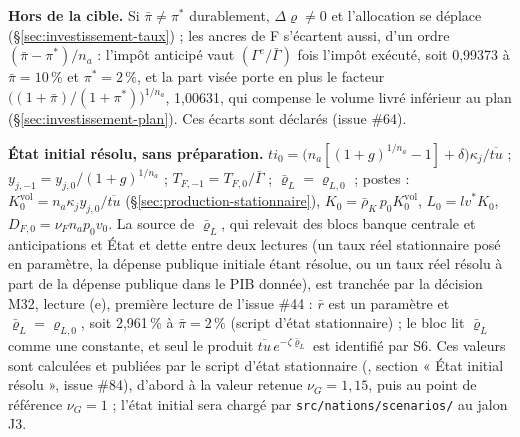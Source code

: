 \documentclass[11pt,a4paper]{article}
\newcommand{\code}[1]{\texttt{\detokenize{#1}}}
\begin{document}
\begin{proposee}
\textbf{Hors de la cible.} Si $\bar\pi \neq \pi^\ast$ durablement, $\Delta\varrho \neq 0$ et l'allocation se déplace (\S\ref{sec:investissement-taux}) ; les ancres de F s'écartent aussi, d'un ordre $(\bar\pi - \pi^\ast)/n_a$ : l'impôt anticipé vaut $(\Gamma^e/\bar\Gamma)$ fois l'impôt exécuté, soit 0,99373 à $\bar\pi = 10\,\%$ et $\pi^\ast = 2\,\%$, et la part visée porte en plus le facteur $\bigl((1 + \bar\pi)/(1 + \pi^\ast)\bigr)^{1/n_a}$, 1,00631, qui compense le volume livré inférieur au plan (\S\ref{sec:investissement-plan}). Ces écarts sont déclarés (issue \#64).

\textbf{État initial résolu, sans préparation.} $\mathit{ti}_0 = \bigl(n_a[(1 + g)^{1/n_a} - 1] + \delta\bigr)\kappa_j/\overline{\mathit{tu}}$ ; $y_{j,-1} = y_{j,0}/(1 + g)^{1/n_a}$ ; $T_{F,-1} = T_{F,0}/\bar\Gamma$ ; $\bar\varrho_L = \varrho_{L,0}$ ; postes : $K^{\mathrm{vol}}_0 = n_a\kappa_j y_{j,0}/\overline{\mathit{tu}}$ (\S\ref{sec:production-stationnaire}), $K_0 = \bar\rho_K\, p_0 K^{\mathrm{vol}}_0$, $L_0 = \mathit{lv}^\ast K_0$, $D_{F,0} = \nu_F n_a p_0 v_0$. La source de $\bar\varrho_L$, qui relevait des blocs banque centrale et anticipations et État et dette entre deux lectures (un taux réel stationnaire posé en paramètre, la dépense publique initiale étant résolue, ou un taux réel résolu à part de la dépense publique dans le PIB donnée), est tranchée par la décision M32, lecture (e), première lecture de l'issue \#44 : $\bar r$ est un paramètre et $\bar\varrho_L = \varrho_{L,0}$, soit 2,961\,\% à $\bar\pi = 2\,\%$ (script d'état stationnaire) ; le bloc lit $\bar\varrho_L$ comme une constante, et seul le produit $\overline{\mathit{tu}}\,e^{-\zeta\bar\varrho_L}$ est identifié par S6. Ces valeurs sont calculées et publiées par le script d'état stationnaire (\code{outils/etat_stationnaire.py}, section « État initial résolu », issue \#84), d'abord à la valeur retenue $\nu_G = 1{,}15$, puis au point de référence $\nu_G = 1$ ; l'état initial sera chargé par \nolinkurl{src/nations/scenarios/} au jalon J3.


\end{proposee}
\end{document}
